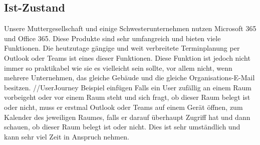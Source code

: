 


\pagebreak
\subsection{Ist-Zustand}\label{sec:ist-zustand}
Unsere Muttergesellschaft und einige Schwesterunternehmen nutzen Microsoft 365 und Office 365. Diese Produkte sind sehr umfangreich und bieten viele Funktionen. Die heutzutage gängige und weit verbreitete Terminplanung per Outlook oder Teams ist eines dieser Funktionen. Diese Funktion ist jedoch nicht immer so praktikabel wie sie es vielleicht sein sollte, vor allem nicht, wenn mehrere Unternehmen, das gleiche Gebäude und die gleiche Organisations-E-Mail besitzen.
\newline
//UserJourney Beispiel einfügen
\newline
Falls ein User zufällig an einem Raum vorbeigeht oder vor einem Raum steht und sich fragt, ob dieser Raum belegt ist oder nicht, muss er erstmal Outlook oder Teams auf einem Gerät öffnen, zum Kalender des jeweiligen Raumes, falls er darauf überhaupt Zugriff hat und dann schauen, ob dieser Raum belegt ist oder nicht.
Dies ist sehr umständlich und kann sehr viel Zeit in Anspruch nehmen.

